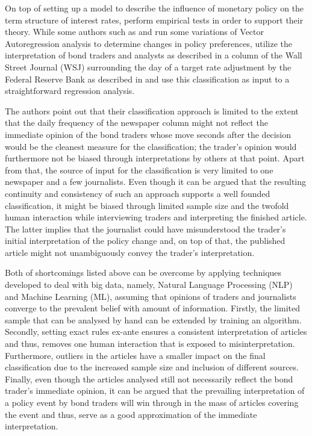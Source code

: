 On top of setting up a model to describe the influence of monetary policy on the term structure of interest rates, \textcite{Ellingsen.2001} perform empirical tests in order to support their theory. While some authors such as \textcite{Peersman.2002} and \textcite{Evans.1998} run some variations of Vector Autoregression analysis to determine changes in policy preferences, \textcite{Ellingsen.2001} utilize the interpretation of bond traders and analysts as described in a column of the Wall Street Journal (WSJ) surrounding the day of a target rate adjustment by the Federal Reserve Bank as described in \textcite{Ellingsen.2003} and use this classification as input to a straightforward regression analysis.

The authors point out that their classification approach is limited to the extent that the daily frequency of the newspaper column might not reflect the immediate opinion of the bond traders whose move seconds after the decision would be the cleanest measure for the classification; the trader's opinion would furthermore not be biased through interpretations by others at that point. Apart from that, the source of input for the classification is very limited to one newspaper and a few journalists. Even though it can be argued that the resulting continuity and consistency of such an approach supports a well founded classification, it might be biased through limited sample size and the twofold human interaction while interviewing traders and interpreting the finished article. The latter implies that the journalist could have misunderstood the trader's initial interpretation of the policy change and, on top of that, the published article might not unambiguously convey the trader's interpretation.

Both of shortcomings listed above can be overcome by applying techniques developed to deal with big data, namely, Natural Language Processing (NLP) and Machine Learning (ML), assuming that opinions of traders and journalists converge to the prevalent belief with amount of information. Firstly, the limited sample that can be analysed by hand can be extended by training an algorithm. Secondly, setting exact rules ex-ante ensures a consistent interpretation of articles and thus, removes one human interaction that is exposed to misinterpretation. Furthermore, outliers in the articles have a smaller impact on the final classification due to the increased sample size and inclusion of different sources. Finally, even though the articles analysed still not necessarily reflect the bond trader's immediate opinion, it can be argued that the prevailing interpretation of a policy event by bond traders will win through in the mass of articles covering the event and thus, serve as a good approximation of the immediate interpretation. 

